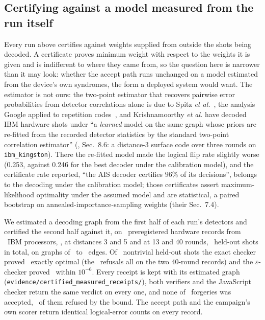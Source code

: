 \documentclass[aps,pra,twocolumn,superscriptaddress,nofootinbib,longbibliography,floatfix]{revtex4-2}
\newcommand{\eps}{\varepsilon}
\begin{document}
\subsection{Certifying against a model measured from the run itself}
\label{sec:measured-model}

Every run above certifies against weights supplied from outside the shots being decoded. A certificate proves minimum weight with respect to the weights it is given and is indifferent to where they came from, so the question here is narrower than it may look: whether the accept path runs unchanged on a model estimated from the device's own syndromes, the form a deployed system would want. The estimator is not ours: the two-point estimator that recovers pairwise error probabilities from detector correlations alone is due to Spitz \textit{et al.}~\cite{spitz2018adaptive}, the analysis Google applied to repetition codes~\cite{chen2021exponential}, and Krishnamoorthy \textit{et al.} have decoded IBM hardware shots under ``a \emph{learned} model on the same graph whose priors are re-fitted from the recorded detector statistics by the standard two-point correlation estimator'' (\cite{krishnamoorthy2026certified}, Sec.~8.6: a distance-3 surface code over three rounds on \texttt{ibm\_kingston}). There the re-fitted model made the logical flip rate slightly worse (0.253, against 0.246 for the best decoder under the calibration model), and the certificate rate reported, ``the AIS decoder certifies $96\%$ of its decisions'', belongs to the decoding under the calibration model; those certificates assert maximum-likelihood optimality under the assumed model and are statistical, a paired bootstrap on annealed-importance-sampling weights (their Sec.~7.4).

We estimated a decoding graph from the first half of each run's detectors and certified the second half against it, on \CertMeasRecords\ preregistered hardware records from \CertMeasDevices\ IBM processors, \CertMeasDeviceList, at distances 3 and 5 and at 13 and 40 rounds, \CertMeasHeldOut\ held-out shots in total, on graphs of \CertMeasEdgesLo\ to \CertMeasEdgesHi\ edges. Of \CertMeasNontrivial\ nontrivial held-out shots the exact checker proved \CertMeasCertified\ exactly optimal (the \CertMeasRefused\ refusals all on the two 40-round records) and the $\eps$-checker proved \CertMeasEpsAccepted\ within $10^{-6}$. Every receipt is kept with its estimated graph (\nolinkurl{evidence/certified_measured_receipts/}), both verifiers and the JavaScript checker return the same verdict on every one, and none of \CertMeasForgeries\ forgeries was accepted, \CertMeasBoundForgeries\ of them refused by the bound. The accept path and the campaign's own scorer return identical logical-error counts on every record.
\end{document}
